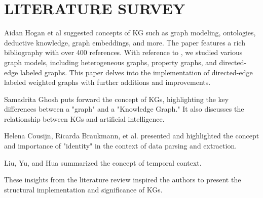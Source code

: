 \documentclass[conference]{IEEEtran}
\begin{document}
\section{LITERATURE SURVEY}

Aidan Hogan et al\cite{b8} suggested concepts of KG such as graph modeling, ontologies, deductive knowledge, graph embeddings, and more. The paper features a rich bibliography with over 400 references.
With reference to \cite{b8}, we studied various graph models, including heterogeneous graphs\cite{b18}, property graphs\cite{b12}, and directed-edge labeled graphs\cite{b8}. This paper delves into the implementation of directed-edge labeled weighted graphs with further additions and improvements.

Samadrita Ghosh \cite{b1} puts forward the concept of KGs, highlighting the key differences between a "graph" and a "Knowledge Graph." It also discusses the relationship between KGs and artificial intelligence.

Helena Cousijn, Ricarda Braukmann, et al. \cite{b16} presented and highlighted the concept and importance of "identity" in the context of data parsing and extraction.

Liu, Yu, and Hua \cite{b17} summarized the concept of temporal context.

These insights from the literature review inspired the authors to present the structural implementation and significance of KGs.



\end{document}
